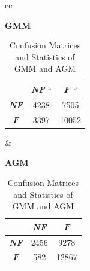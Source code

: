 \documentclass[conference]{IEEEtran}
\begin{document}
\begin{table}[b]
\caption{Confusion Matrices and Statistics of GMM and AGM}
\begin{center}

\begin{minipage}{0.75\textwidth}
\begin{flushleft}
\begin{tabular}{cc}

\begin{minipage}{.3\textwidth} 
\begin{center}
\textbf{GMM} \\
\begin{tabular}{|c|c|c|}
\hline
 & \multicolumn{1}{|p{.7cm}|}{\centering \textbf{\textit{NF $^{\mathrm{a}}$}}} & \multicolumn{1}{|p{.7cm}|}{\centering \textbf{\textit{F $^{\mathrm{b}}$}}}\\
\hline
\multicolumn{1}{|p{.7cm}|}{\centering \textbf{\textit{NF}}} & 4238 & 7505\\
\multicolumn{1}{|p{.7cm}|}{\centering \textbf{\textit{F}}} & 3397 & 10052\\
\hline
\end{tabular}
\end{center}
\end{minipage} &

\begin{minipage}{.3\textwidth}    
\begin{center}
\textbf{AGM} \\
\begin{tabular}{|c|c|c|}
\hline
 & \multicolumn{1}{|p{.7cm}|}{\centering \textbf{\textit{NF}}} & \multicolumn{1}{|p{.7cm}|}{\centering \textbf{\textit{F}}}\\
\hline
\multicolumn{1}{|p{.7cm}|}{\centering \textbf{\textit{NF}}} & 2456 & 9278\\
\multicolumn{1}{|p{.7cm}|}{\centering \textbf{\textit{F}}} & 582 & 12867\\
\hline
\end{tabular}
\end{center}
\end{minipage}  

\end{tabular}
\end{flushleft}
\end{minipage}
\end{center}


\end{table}
\end{document}
